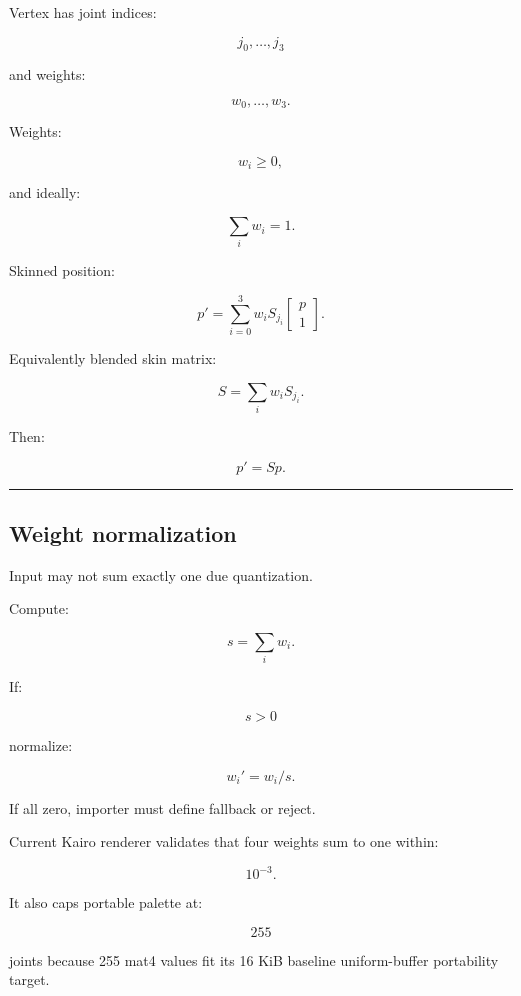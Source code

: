 \hypertarget{04-visual-computing-ii-ch041-linear-blend-skinning}{}

Vertex has joint indices:

\[
j_0,\dots,j_3
\]

and weights:

\[
w_0,\dots,w_3.
\]

Weights:

\[
w_i\ge0,
\]

and ideally:

\[
\boxed{
\sum_iw_i=1.
}
\]

Skinned position:

\[
\boxed{
p'
=
\sum_{i=0}^{3}
w_i
S_{j_i}
\begin{bmatrix}
p\\1
\end{bmatrix}.
}
\]

Equivalently blended skin matrix:

\[
S=
\sum_iw_iS_{j_i}.
\]

Then:

\[
p'=Sp.
\]

\begin{center}\rule{0.5\linewidth}{0.5pt}\end{center}

\subsection{Weight normalization}\label{04-visual-computing-ii-ch041-weight-normalization}

\hypertarget{04-visual-computing-ii-ch041-weight-normalization}{}

Input may not sum exactly one due quantization.

Compute:

\[
s=
\sum_iw_i.
\]

If:

\[
s>0
\]

normalize:

\[
w_i'=w_i/s.
\]

If all zero, importer must define fallback or reject.

Current Kairo renderer validates that four weights sum to one within:

\[
10^{-3}.
\]

It also caps portable palette at:

\[
255
\]

joints because 255 mat4 values fit its 16 KiB baseline uniform-buffer portability target.

